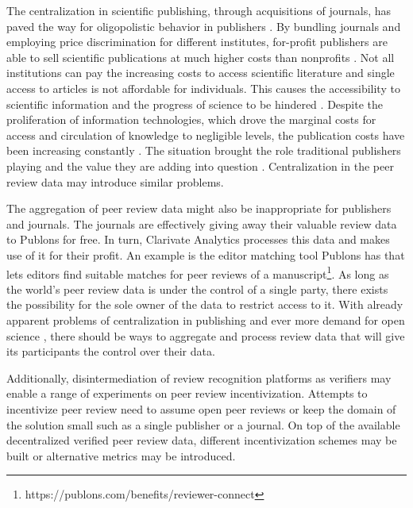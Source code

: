 The centralization in scientific publishing, through acquisitions of journals, has paved the way for oligopolistic behavior in publishers \parencite{Lariviere.2015}. By bundling journals and employing price discrimination for different institutes, for-profit publishers are able to sell scientific publications at much higher costs than nonprofits \parencite{Bergstrom.2014}. Not all institutions can pay the increasing costs to access scientific literature and single access to articles is not affordable for individuals. This causes the accessibility to scientific information and the progress of science to be hindered \parencite[3]{Tennant.2016}. Despite the proliferation of information technologies, which drove the marginal costs for access and circulation of knowledge to negligible levels, the publication costs have been increasing constantly \parencite{Tennant.2016}. The situation brought the role traditional publishers playing and the value they are adding into question \parencite{Heise.2020}. Centralization in the peer review data may introduce similar problems.

The aggregation of peer review data might also be inappropriate for publishers and journals. The journals are effectively giving away their valuable review data to Publons for free. In turn, Clarivate Analytics processes this data and makes use of it for their profit. An example is the editor matching tool Publons has that lets editors find suitable matches for peer reviews of a manuscript\footnote{https://publons.com/benefits/reviewer-connect}. As long as the world’s peer review data is under the control of a single party, there exists the possibility for the sole owner of the data to restrict access to it. With already apparent problems of centralization in publishing \parencite{Lariviere.2015} and ever more demand for open science \parencite[1-3]{Piwowar.2018}, there should be ways to aggregate and process review data that will give its participants the control over their data. 

Additionally, disintermediation of review recognition platforms as verifiers may enable a range of experiments on peer review incentivization. Attempts to incentivize peer review need to assume open peer reviews or keep the domain of the solution small such as a single publisher or a journal. On top of the available decentralized verified peer review data, different incentivization schemes may be built or alternative metrics may be introduced. 

